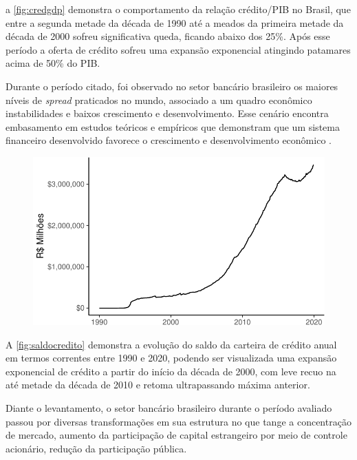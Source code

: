\documentclass[12pt,openright,oneside,a4paper,chapter=TITLE,section=TITLE,subsection=TITLE,english,french,spanish,portugues,sumario=tradicional]{04-class-files/abntex2}
\begin{document}
a \autoref{fig:credgdp} demonstra o comportamento da relação crédito/PIB no
Brasil, que entre a segunda metade da década de 1990 até a meados da primeira
metade da década de 2000 sofreu significativa queda, ficando abaixo dos 25\%.
Após esse período a oferta de crédito sofreu uma expansão exponencial atingindo
patamares acima de 50\% do PIB.

Durante o período citado, foi observado no setor bancário brasileiro os maiores
níveis de \emph{spread} praticados no mundo, associado a um quadro econômico
instabilidades e baixos crescimento e desenvolvimento. Esse cenário encontra
embasamento em estudos teóricos e empíricos que demonstram que um sistema
financeiro desenvolvido favorece o crescimento e desenvolvimento econômico
\cite{levine:1997, matos:2003}.

\begin{figure}

\begin{center}\includegraphics{12-exportedfigures/balance credit-1} \end{center}
\label{fig:saldocredito}
\end{figure}

A \autoref{fig:saldocredito} demonstra a evolução do saldo da carteira de
crédito anual em termos correntes entre 1990 e 2020, podendo ser visualizada
uma expansão exponencial de crédito a partir do início da década de 2000, com
leve recuo na até metade da década de 2010 e retoma ultrapassando máxima
anterior.

Diante o levantamento, o setor bancário brasileiro durante o período avaliado
passou por diversas transformações em sua estrutura no que tange a concentração
de mercado, aumento da participação de capital estrangeiro por meio de controle
acionário, redução da participação pública.
\end{document}
